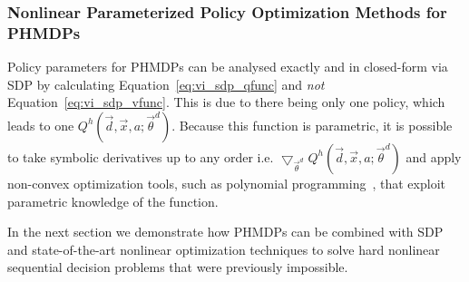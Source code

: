 \subsubsection{Nonlinear Parameterized Policy Optimization Methods for PHMDPs}

Policy parameters for PHMDPs can be analysed exactly and in closed-form via SDP by calculating Equation~\eqref{eq:vi_sdp_qfunc} and \textit{not} Equation~\eqref{eq:vi_sdp_vfunc}. This is due to there being only one policy, which leads to one {\footnotesize $ Q^{h}(\vec{d}, \vec{x}, a; \vec{\theta}^{d}) $}. Because this function is parametric, it is possible to take symbolic derivatives up to any order i.e. {\footnotesize $\bigtriangledown_{\vec{\theta}^{d}} Q^{h}(\vec{d}, \vec{x}, a; \vec{\theta}^{d})$ } and apply non-convex optimization tools, such as polynomial programming~\parencite{sherali1992global}, that exploit parametric knowledge of the function.

In the next section we demonstrate how PHMDPs can be combined with SDP and state-of-the-art nonlinear optimization techniques to solve hard nonlinear sequential decision problems that were previously impossible.
